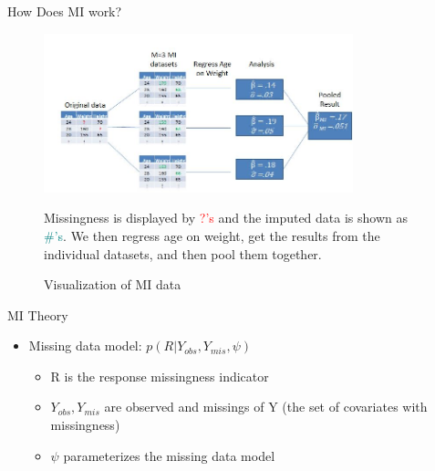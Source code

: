 \begin{frame}{How Does MI work?}
 \begin{figure}[h!]
  \centering
    \includegraphics[width=0.8\textwidth]{mi_example_full.jpg}
  \caption{Visualization of MI data}
\label{fig:miexample}
\medskip
\small
Missingness is displayed by \textcolor{red}{?'s} and the imputed data is shown  as \textcolor{teal}{\#'s}.
We then regress age on weight, get the results from the individual datasets, and then pool them together.
\end{figure}
\end{frame}

\begin{frame}{MI Theory}
 \begin{itemize}
  \item Missing data model: $p(R|Y_{obs},Y_{mis},\psi)$
  \begin{itemize}
     \item R is the response missingness indicator
   \item $Y_{obs},Y_{mis}$ are observed and missings of Y (the set of covariates with missingness)
   \item $\psi$ parameterizes the missing data model
  \end{itemize}

 \end{itemize}

\end{frame}


